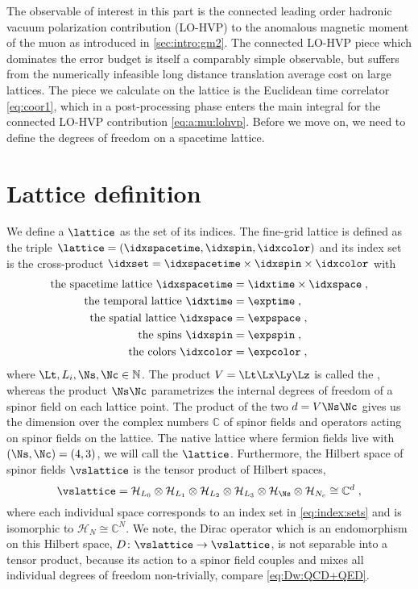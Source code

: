 The observable of interest in this part is the connected leading order hadronic vacuum polarization contribution (LO-HVP) to the anomalous magnetic moment of the muon as introduced in \cref{sec:intro:gm2}.
The connected LO-HVP piece which dominates the error budget is itself a comparably simple observable, but suffers from the numerically infeasible long distance translation average cost on large lattices.
The piece we calculate on the lattice is the Euclidean time correlator \cref{eq:coor1}, which in a post-processing phase enters the main integral for the connected LO-HVP contribution \cref{eq:a:mu:lohvp}.
Before we move on, we need to define the degrees of freedom on a spacetime lattice.

\section{Lattice definition}
\label{sec:lattice:definition}

We define a  $\lattice$ as the set of its indices.
The fine-grid lattice is defined as the triple $\lattice = (\idxspacetime, \idxspin, \idxcolor)$ and its index set is the cross-product $\idxset = \idxspacetime \times \idxspin \times \idxcolor$ with
\begin{align}
\begin{aligned}
\text{the spacetime lattice }
    \idxspacetime &= \idxtime \times \idxspace \;, \\
\text{the temporal lattice }
    \idxtime  &= \exptime \;, \\
\text{the spatial lattice }
    \idxspace &= \expspace \;, \\
\text{the spins }
    \idxspin  &= \expspin \;, \\
\text{the colors }
    \idxcolor &= \expcolor \;,
\end{aligned} \label{eq:index:sets}
\end{align}
where $\Lt,L_i,\Ns,\Nc \in \mathbb{N}$.
The product $V = \Lt \Lx \Ly \Lz$ is called the , whereas the product $\Ns \Nc$ parametrizes the internal degrees of freedom of a spinor field on each lattice point.
The product of the two $d = V \Ns \Nc$ gives us the dimension over the complex numbers $\mathbb{C}$ of spinor fields and operators acting on spinor fields on the lattice.
The native lattice where fermion fields live with $(\Ns, \Nc) = (4,3)$, we will call the  $\lattice$.
Furthermore, the Hilbert space of spinor fields $\vslattice$ is the tensor product of Hilbert spaces,
\begin{equation}
\vslattice = \mathcal{H}_{L_0} \otimes \mathcal{H}_{L_1} \otimes \mathcal{H}_{L_2} \otimes \mathcal{H}_{L_3} \otimes \mathcal{H}_{\Ns} \otimes \mathcal{H}_{N_c} \cong \mathbb{C}^{d} \;,
\end{equation}
where each individual space corresponds to an index set in \cref{eq:index:sets} and is isomorphic to $\mathcal{H}_{N} \cong \mathbb{C}^{N}$.
We note, the Dirac operator which is an endomorphism on this Hilbert space, $D \colon \vslattice \rightarrow \vslattice$, is not separable into a tensor product, because its action to a spinor field couples and mixes all individual degrees of freedom non-trivially, compare \cref{eq:Dw:QCD+QED}.

